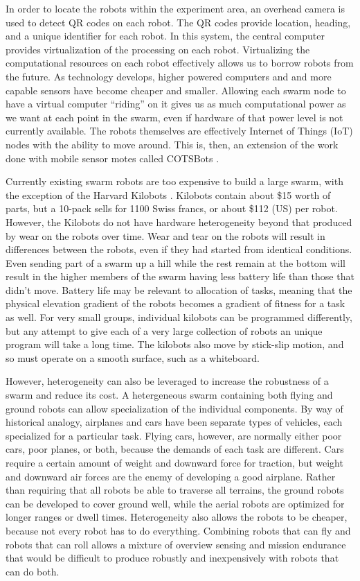 \documentclass[]{article}
\begin{document}
In order to locate the robots within the experiment area, an overhead camera is used to detect QR codes on each robot. 
The QR codes provide location, heading, and a unique identifier for each robot. 
In this system, the central computer provides virtualization of the processing on each robot. 
Virtualizing the computational resources on each robot effectively allows us to borrow robots from the future. 
As technology develops, higher powered computers and and more capable sensors have become cheaper and smaller. 
Allowing each swarm node to have a virtual computer ``riding'' on it gives us as much computational power as we want at each point in the swarm, even if hardware of that power level is not currently available.
The robots themselves are effectively Internet of Things (IoT) nodes with the ability to move around. 
This is, then, an extension of the work done with mobile sensor motes called COTSBots \cite{bergbreiter2003cotsbots}.

Currently existing swarm robots are too expensive to build a large swarm, with the exception of the Harvard Kilobots \cite{rubenstein2014kilobot}. 
Kilobots contain about \$15 worth of parts, but a 10-pack sells for 1100 Swiss francs, or about \$112 (US) per robot. 
However, the Kilobots do not have hardware heterogeneity beyond that produced by wear on the robots over time. 
Wear and tear on the robots will result in differences between the robots, even if they had started from identical conditions. 
Even sending part of a swarm up a hill while the rest remain at the bottom will result in the higher members of the swarm having less battery life than those that didn't move. 
Battery life may be relevant to allocation of tasks, meaning that the physical elevation gradient of the robots becomes a gradient of fitness for a task as well. 
For very small groups, individual kilobots can be programmed differently, but any attempt to give each of a very large collection of robots an unique program will take a long time. 
The kilobots also move by stick-slip motion, and so must operate on a smooth surface, such as a whiteboard. 

However, heterogeneity can also be leveraged to increase the robustness of a swarm and reduce its cost. 
A hetergeneous swarm containing both flying and ground robots can allow specialization of the individual components. 
By way of historical analogy, airplanes and cars have been separate types of vehicles, each specialized for a particular task. 
Flying cars, however, are normally either poor cars, poor planes, or both, because the demands of each task are different. 
Cars require a certain amount of weight and downward force for traction, but weight and downward air forces are the enemy of developing a good airplane. 
Rather than requiring that all robots be able to traverse all terrains, the ground robots can be developed to cover ground well, while the aerial robots are optimized for longer ranges or dwell times. 
Heterogeneity also allows the robots to be cheaper, because not every robot has to do everything.
Combining robots that can fly and robots that can roll allows a mixture of overview sensing and mission endurance that would be difficult to produce robustly and inexpensively with robots that can do both. 
\end{document}
